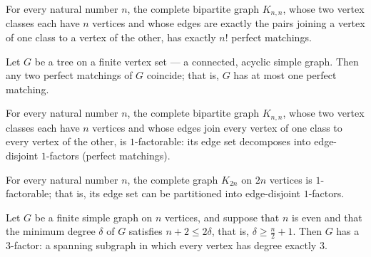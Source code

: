 \begin{theorem}
\label{SimpleGraph.card_perfectMatching_completeBipartite}
For every natural number $n$, the complete bipartite graph $K_{n,n}$, whose two vertex
classes each have $n$ vertices and whose edges are exactly the pairs joining a vertex of
one class to a vertex of the other, has exactly $n!$ perfect matchings.
\end{theorem}

\begin{theorem}
\label{SimpleGraph.isTree_subsingleton_perfectMatching}
Let $G$ be a tree on a finite vertex set — a connected, acyclic simple graph. Then any
two perfect matchings of $G$ coincide; that is, $G$ has at most one perfect matching.
\end{theorem}

\begin{theorem}
\label{SimpleGraph.completeBipartite_one_factorable}
For every natural number $n$, the complete bipartite graph $K_{n,n}$, whose two vertex
classes each have $n$ vertices and whose edges join every vertex of one class to every
vertex of the other, is $1$-factorable: its edge set decomposes into edge-disjoint
$1$-factors (perfect matchings).
\end{theorem}

\begin{theorem}
\label{SimpleGraph.completeGraph_even_one_factorable}
For every natural number $n$, the complete graph $K_{2n}$ on $2n$ vertices is
$1$-factorable; that is, its edge set can be partitioned into edge-disjoint $1$-factors.
\end{theorem}

\begin{theorem}
\label{SimpleGraph.exists_three_factor_of_minDegree}
Let $G$ be a finite simple graph on $n$ vertices, and suppose that $n$ is even and that
the minimum degree $\delta$ of $G$ satisfies $n + 2 \le 2\delta$, that is, $\delta \ge
\tfrac{n}{2} + 1$. Then $G$ has a $3$-factor: a spanning subgraph in which every vertex
has degree exactly $3$.
\end{theorem}

